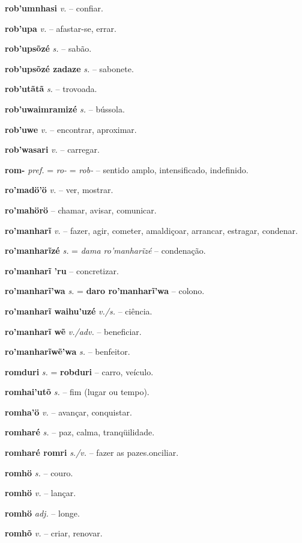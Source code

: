 \textbf{rob'umnhasi} \textit{v.} -- confiar.

\textbf{rob'upa} \textit{v.} -- afastar-se, errar.

\textbf{rob'upsõzé} \textit{s.} -- sabão.

\textbf{rob'upsõzé zadaze} \textit{s.} -- sabonete.

\textbf{rob'utãtã} \textit{s.} -- trovoada.

\textbf{rob'uwaimramizé} \textit{s.} -- bússola.

\textbf{rob'uwe} \textit{v.} -- encontrar, aproximar.

\textbf{rob'wasari} \textit{v.} -- carregar.

\textbf{rom-} \textit{pref.} = \textit{ro-} = \textit{rob-} -- sentido amplo, intensificado, indefinido.

\textbf{ro'madö'ö} \textit{v.} -- ver, mostrar.

\textbf{ro'mahörö} \textit{} -- chamar, avisar, comunicar.

\textbf{ro'manharĩ} \textit{v.} -- fazer, agir, cometer, amaldiçoar, arrancar, estragar, condenar.

\textbf{ro'manharĩzé} \textit{s.} = \textit{dama ro'manharĩzé} -- condenação.

\textbf{ro'manharĩ 'ru} \textit{} -- concretizar.

\textbf{ro'manharĩ'wa} \textit{s.} = \textbf{daro ro'manharĩ'wa} -- colono.

\textbf{ro'manharĩ waihu'uzé} \textit{v./s.} -- ciência.

\textbf{ro'manharĩ wẽ} \textit{v./adv.} -- beneficiar.

\textbf{ro'manharĩwẽ'wa} \textit{s.} -- benfeitor.

\textbf{romduri} \textit{s.} = \textbf{robduri} -- carro, veículo.

\textbf{romhai'utõ} \textit{s.} -- fim (lugar ou tempo).

\textbf{romha'ö} \textit{v.} -- avançar, conquistar.

\textbf{romharé} \textit{s.} -- paz, calma, tranqüilidade.

\textbf{romharé romri} \textit{s./v.} -- fazer as pazes.onciliar.

\textbf{romhö} \textit{s.} -- couro.

\textbf{romhö} \textit{v.} -- lançar.

\textbf{romhö} \textit{adj.} -- longe.

\textbf{romhõ} \textit{v.} -- criar, renovar.

